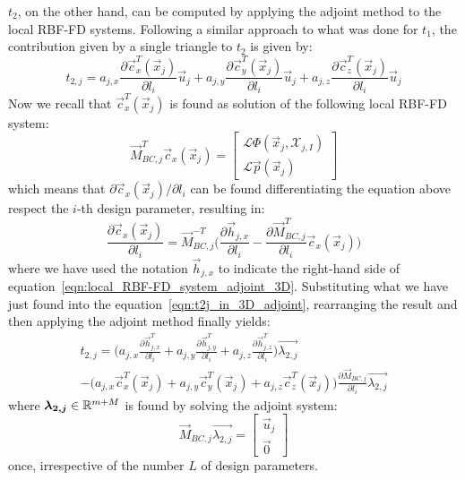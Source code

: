 $t_2$, on the other hand, can be computed by applying the adjoint method to the local RBF-FD systems. Following a similar approach to what was done for $t_1$, the contribution given by a single triangle to $t_2$ is given by:
\begin{equation}
	\label{eqn:t2j_in_3D_adjoint}
	t_{2,j} = a_{j,x}\frac{\partial \vec{c}_x^T(\vec{x}_j)}{\partial l_i}\vec{u}_j + a_{j,y}\frac{\partial \vec{c}_y^T(\vec{x}_j)}{\partial l_i}\vec{u}_j + a_{j,z}\frac{\partial \vec{c}_z^T(\vec{x}_j)}{\partial l_i}\vec{u}_j
\end{equation}
Now we recall that $\vec{c}_x^T(\vec{x}_j)$ is found as solution of the following local RBF-FD system:
\begin{equation}
	\label{eqn:local_RBF-FD_system_adjoint_3D}
	\vec{M}_{BC,j}^T \vec{c}_x(\vec{x}_j) =
	\begin{bmatrix}
		\mathcal{L} \Phi(\vec{x}_j, \mathcal{X}_{j,I})  \\
		\mathcal{L} \vec{p}(\vec{x}_j)
	\end{bmatrix}
\end{equation}
which means that $\partial \vec{c}_x(\vec{x}_j) / \partial l_i$ can be found differentiating the equation above respect the $i$-th design parameter, resulting in:
\begin{equation}
	\label{eqn:local_RBF-FD_system_differentited}
	\frac{\partial \vec{c}_x(\vec{x}_j)}{\partial l_i} = \vec{M}_{BC,j}^{-T} \biggl( \frac{\partial \vec{h}_{j,x}}{\partial l_i} - \frac{\partial \vec{M}_{BC,j}^T}{\partial l_i}\vec{c}_x(\vec{x}_j) \biggr)
\end{equation}
where we have used the notation $\vec{h}_{j,x}$ to indicate the right-hand side of equation~\eqref{eqn:local_RBF-FD_system_adjoint_3D}.
Substituting what we have just found into the equation~\eqref{eqn:t2j_in_3D_adjoint}, rearranging the result and then applying the adjoint method finally yields:
\begin{multline}
	t_{2,j} = \biggl( a_{j,x} \frac{\partial \vec{h}_{j,x}^T}{\partial l_i} + a_{j,y} \frac{\partial \vec{h}_{j,y}^T}{\partial l_i} + a_{j,z} \frac{\partial \vec{h}_{j,z}^T}{\partial l_i} \biggr) \vec{\lambda_{2,j}}  \\
	 - \biggl( a_{j,x}\vec{c}_x^T(\vec{x}_j) + a_{j,y}\vec{c}_y^T(\vec{x}_j) + a_{j,z}\vec{c}_z^T(\vec{x}_j) \biggr) \frac{\partial \vec{M}_{BC,j}}{\partial l_i} \vec{\lambda_{2,j}}
\end{multline}
where $\boldsymbol{\lambda_{2,j}} \in \mathbb{R}^{m+M}$ is found by solving the adjoint system:
\begin{equation}
	\label{eqn:adjoint_system_t2j}
	\vec{M}_{BC,j} \vec{\lambda_{2,j}} =
	\begin{bmatrix}
		\vec{u}_j  \\
		\vec{0}
	\end{bmatrix}
\end{equation}
once, irrespective of the number $L$ of design parameters.

